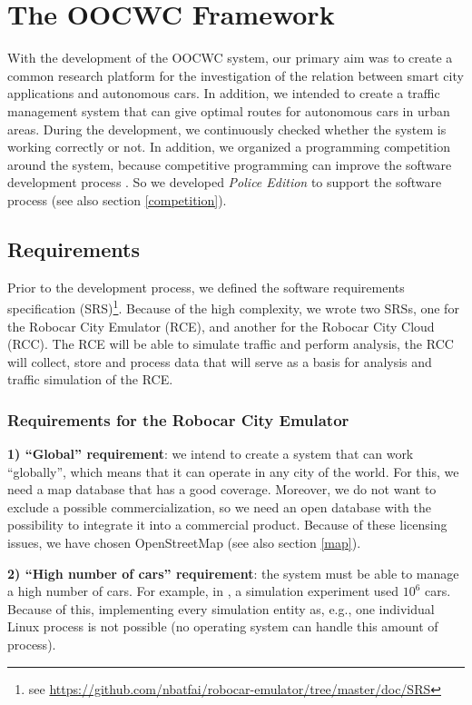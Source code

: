 \documentclass[b5paper,12pt]{report}
\theoremstyle{definition}
\begin{document}
\chapter{The OOCWC Framework}
\label{oocwc}

With the development of the OOCWC system, our primary aim was to create a common research platform for the investigation of the relation between smart city applications and autonomous cars. In addition, we intended to create a traffic management system that can give optimal routes for autonomous cars in urban areas. During the development, we continuously checked whether the system is working correctly or not. In addition, we organized a programming competition around the system, because competitive programming can improve the software development process \cite{compprog}. So we developed \textit{Police Edition} to support the software process (see also section \ref{competition}).

\section{Requirements}

Prior to the development process, we defined the software requirements specification (SRS)\footnote{see \url{https://github.com/nbatfai/robocar-emulator/tree/master/doc/SRS}}. Because of the high complexity, we wrote two SRSs, one for the Robocar City Emulator (RCE), and another for the Robocar City Cloud (RCC). The RCE will be able to simulate traffic and perform analysis, the RCC will collect, store and process data that will serve as a basis for analysis and traffic simulation of the RCE.

\subsection{Requirements for the Robocar City Emulator}

{\bf{1) \enquote{Global} requirement}}: we intend to create a system that can work \enquote{globally}, which means that it can operate in any city of the world. For this, we need a map database that has a good coverage. Moreover, we do not want to exclude a possible commercialization, so we need an open database with the possibility to integrate it into a commercial product. Because of these licensing issues, we have chosen OpenStreetMap (see also section \ref{map}).

{\bf{2) \enquote{High number of cars} requirement}}: the system must be able to manage a high number of cars. For example, in \cite{singapore}, a simulation experiment used $10^6$ cars. Because of this, implementing every simulation entity as, e.g., one individual Linux process is not possible (no operating system can handle this amount of process).
\end{document}
